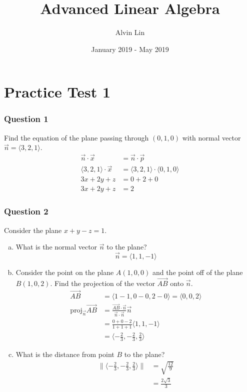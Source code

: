 \documentclass{math}
\title{Advanced Linear Algebra}
\author{Alvin Lin}
\date{January 2019 - May 2019}
\begin{document}
\maketitle

\section*{Practice Test 1}

\subsubsection*{Question 1}
Find the equation of the plane passing through \( (0, 1, 0) \) with normal
vector \( \vec{n} = \langle3,2,1\rangle \).
\begin{align*}
  \vec{n}\cdot\vec{x} &= \vec{n}\cdot\vec{p} \\
  \langle3,2,1\rangle\cdot\vec{x} &=
    \langle3,2,1\rangle\cdot\langle0,1,0\rangle \\
  3x+2y+z &= 0+2+0 \\
  3x+2y+z &= 2
\end{align*}

\subsubsection*{Question 2}
Consider the plane \( x+y-z = 1 \).
\begin{enumerate}[(a)]
  \item What is the normal vector \( \vec{n} \) to the plane?
  \[ \vec{n} = \langle1,1,-1\rangle \]
  \item Consider the point on the plane \( A(1,0,0) \) and the point off of the
    plane \( B(1,0,2) \). Find the projection of the vector
    \( \overrightarrow{AB} \) onto \( \vec{n} \).
  \begin{align*}
    \overrightarrow{AB} &= \langle1-1,0-0,2-0\rangle = \langle0,0,2\rangle \\
    \text{proj}_{\vec{n}}\overrightarrow{AB} &=
      \frac{\overrightarrow{AB}\cdot\vec{n}}{\vec{n}\cdot\vec{n}}\vec{n} \\
    &= \frac{0+0-2}{1+1+1}\langle1,1,-1\rangle \\
    &= \langle-\frac{2}{3},-\frac{2}{3},\frac{2}{3}\rangle
  \end{align*}
  \item What is the distance from point \( B \) to the plane?
  \begin{align*}
    \|\langle-\frac{2}{3},-\frac{2}{3},\frac{2}{3}\rangle\| &=
      \sqrt{\frac{12}{9}} \\
    &= \frac{2\sqrt{3}}{3}
  \end{align*}
\end{enumerate}
\end{document}
